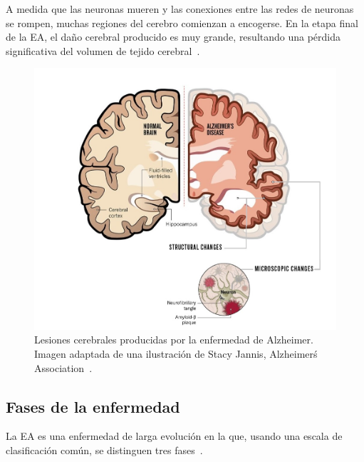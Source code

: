 A medida que las neuronas mueren y las conexiones entre las redes de neuronas se rompen, muchas regiones del cerebro
comienzan a encogerse.
En la etapa final de la EA, el daño cerebral producido es muy grande, resultando una pérdida significativa del volumen
de tejido cerebral~\cite{img-cambios-cerebrales}.

\begin{figure}[H]
    \centering
    \includegraphics[width=\textwidth]{./imgs/lesiones-cerebrales}
    \caption{Lesiones cerebrales producidas por la enfermedad de Alzheimer.\\Imagen adaptada de una
    ilustración de Stacy Jannis, Alzheimer\'s Association~\cite{nature}.}
    \label{fig:lesiones-cerebrales}
\end{figure}

\subsection{Fases de la enfermedad}\label{subsec:fases-enfermedad}
La EA es una enfermedad de larga evolución en la que, usando una escala de clasificación común, se distinguen
tres fases~\cite{alz-org-etapas}.

